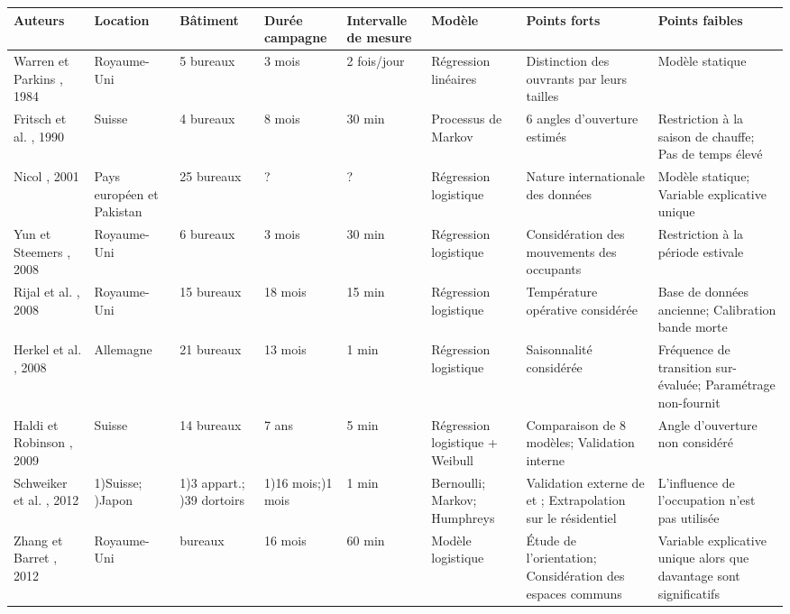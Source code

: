 \begin{landscape}
\begin{table} [H]
\begin{tabular}{|p{2.5cm}|p{2cm}|p{2cm}|p{2cm}|p{2cm}|p{2cm}|p{4cm}|p{4cm}|}
\hline 
Auteurs & Location & Bâtiment & Durée campagne & Intervalle de mesure & Modèle & Points forts & Points faibles \\ 
\hline 
\hline
Warren et Parkins \cite{Warren-84}, 1984 & Royaume-Uni & 5 bureaux & 3 mois & 2 fois/jour & Régression linéaires & Distinction des ouvrants par leurs tailles & Modèle statique \\ 
\hline 
Fritsch et al. \cite{Fritsch-90}, 1990 & Suisse & 4 bureaux & 8 mois & 30 min & Processus de Markov & 6 angles d'ouverture estimés & Restriction à la saison de chauffe; Pas de temps élevé \\ 
\hline 
Nicol \cite{Nicol-01}, 2001 & Pays européen et Pakistan & 25 bureaux & ? & ? & Régression logistique & Nature internationale des données & Modèle statique; Variable explicative unique \\ 
\hline 
Yun et Steemers  \cite{Yun-08}, 2008 & Royaume-Uni & 6 bureaux & 3 mois & 30 min & Régression logistique & Considération des mouvements des occupants & Restriction à la période estivale \\ 
\hline 
Rijal et al. \cite{Rijal-08}, 2008 & Royaume-Uni & 15 bureaux & 18 mois & 15 min & Régression logistique & Température opérative considérée & Base de données ancienne; Calibration bande morte \\ 
\hline 
Herkel et al. \cite{Herkel-08}, 2008 & Allemagne & 21 bureaux & 13 mois & 1 min & Régression logistique & Saisonnalité considérée & Fréquence de transition sur-évaluée; Paramétrage non-fournit \\ 
\hline 
Haldi et Robinson \cite{Haldi-09}, 2009 & Suisse & 14 bureaux & 7 ans & 5 min & Régression logistique + Weibull & Comparaison de 8 modèles; Validation interne & Angle d'ouverture non considéré \\ 
\hline 
Schweiker et al. \cite{Schweiker-12}, 2012 & 1)Suisse; \newline 2)Japon & 1)3 appart.; \newline 2)39 dortoirs & 1)16 mois;\newline 2)1 mois & 1 min & Bernoulli; Markov; Humphreys & Validation externe de \cite{Haldi-09} et \cite{Rijal-08}; Extrapolation sur le résidentiel & L'influence de l'occupation n'est pas utilisée \\ 
\hline 
Zhang et Barret \cite{Zhang-12}, 2012 & Royaume-Uni & bureaux & 16 mois & 60 min & Modèle logistique & Étude de l'orientation; Considération des espaces communs & Variable explicative unique alors que davantage sont significatifs \\ 

\end{tabular}
\end{table}
\end{landscape}
